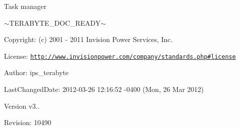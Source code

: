 \begin{DoxyVerb}  Task manager
\end{DoxyVerb}
 $\sim$\-T\-E\-R\-A\-B\-Y\-T\-E\-\_\-\-D\-O\-C\-\_\-\-R\-E\-A\-D\-Y$\sim$ \begin{DoxyParagraph}{Copyright\-:}
(c) 2001 -\/ 2011 Invision Power Services, Inc.
\end{DoxyParagraph}
\begin{DoxyParagraph}{License\-:}
\href{http://www.invisionpower.com/company/standards.php#license}{\tt http\-://www.\-invisionpower.\-com/company/standards.\-php\#license}
\end{DoxyParagraph}
\begin{DoxyParagraph}{Author\-:}
ips\-\_\-terabyte 
\end{DoxyParagraph}
\begin{DoxyParagraph}{Last\-Changed\-Date\-:}
2012-\/03-\/26 12\-:16\-:52 -\/0400 (Mon, 26 Mar 2012) 
\end{DoxyParagraph}
\begin{DoxyVersion}{Version}
v3.. 
\end{DoxyVersion}
\begin{DoxyParagraph}{Revision\-:}
10490 
\end{DoxyParagraph}

